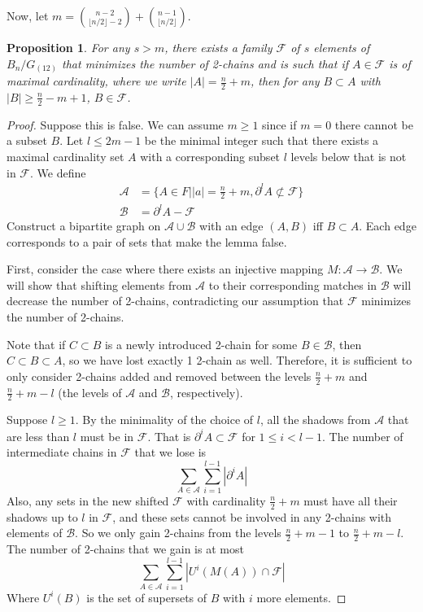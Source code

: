 \documentclass[12pt]{article}
\theoremstyle{plain}
\newtheorem{proposition}[theorem]{Proposition}
\theoremstyle{definition}
\theoremstyle{remark}
\newcommand{\F}{\mathcal{F}}
\newcommand{\A}{\mathcal{A}}
\newcommand{\B}{\mathcal{B}}
\begin{document}
Now, let $m = \binom{n-2}{\lfloor n/2 \rfloor -2} + \binom{n-1}{\lfloor n/2 \rfloor}$.

\begin{proposition}
\label{proposition1} For any $s > m$, there exists a family $\F$ of $s$ elements of $B_n / G_{(12)}$ that minimizes the number of 2-chains and is such that if $A \in \F$ is of maximal cardinality, where we write $|A| = \frac{n}{2}+m$, then for any $B \subset A$ with $|B| \geq \frac{n}{2} - m + 1$, $B \in \F$.
\end{proposition}

\begin{proof} Suppose this is false. We can assume $m \geq 1$ since if $m = 0$ there cannot be a subset $B$. Let $l \leq 2m-1$ be the minimal integer such that there exists a maximal cardinality set $A$ with a corresponding subset $l$ levels below that is not in $\F$. We define
\begin{align*}
\A &= \{A \in F| \lvert a \rvert = \frac{n}{2}+m, \partial^l A \not\subset \F \}\\
\B &= \partial^l A - \F
\end{align*}
Construct a bipartite graph on $\A \cup \B$ with an edge $(A,B)$ iff $B \subset A$. Each edge corresponds to a pair of sets that make the lemma false.

First, consider the case where there exists an injective mapping $M: \A \to \B$. We will show that shifting elements from $\A$ to their corresponding matches in $\B$ will decrease the number of 2-chains, contradicting our assumption that $\F$ minimizes the number of 2-chains.

Note that if $C \subset B$ is a newly introduced 2-chain for some $B \in \B$, then $C \subset B \subset A$, so we have lost exactly 1 2-chain as well. Therefore, it is sufficient to only consider 2-chains added and removed between the levels $\frac{n}{2} + m$ and $\frac{n}{2} + m - l$ (the levels of $\A$ and $\B$, respectively).

Suppose $l \geq 1$. By the minimality of the choice of $l$, all the shadows from $\A$ that are less than $l$ must be in $\F$. That is $\partial^i A \subset \F$ for $1 \leq i < l -1$. The number of intermediate chains in $\F$ that we lose is
\[ \sum_{A \in \A}\sum_{i = 1}^{l-1} |\partial^i A | \]
Also, any sets in the new shifted $\F$ with cardinality $\frac{n}{2} + m$ must have all their shadows up to $l$ in $\F$, and these sets cannot be involved in any 2-chains with elements of $\B$. So we only gain 2-chains from the levels $\frac{n}{2} + m - 1$ to $\frac{n}{2} + m - l$. The number of 2-chains that we gain is at most
\[\sum_{A\in \A}\sum_{i = 1}^{l-1} |U^i(M(A)) \cap \F| \]
Where $U^i(B)$ is the set of supersets of $B$ with $i$ more elements.


\end{proof}
\end{document}
